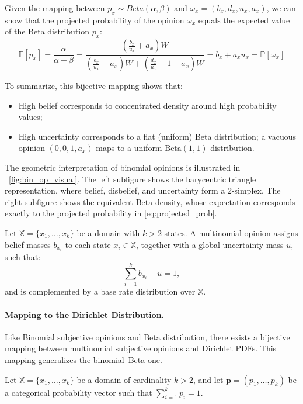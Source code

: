 Given the mapping between \(p_x \sim Beta(\alpha,\beta)\) and \(\omega_x=\left(b_x, d_x, u_x, a_x \right)\), we can show that the projected probability of the opinion \(\omega_x\) equals the expected value of the Beta distribution \(p_x\):
\begin{equation}
    \mathbb{E}[p_x] = \frac{\alpha}{\alpha + \beta} = \frac{\left(\frac{b_x}{u_x} + a_x\right)W }{\left(\frac{b_x}{u_x} + a_x\right)W  + \left(\frac{d_x}{u_x} + 1 - a_x \right)W} = b_x + a_x u_x = \mathbb{P}[\omega_x]
\end{equation}


To summarize, this bijective mapping shows that:
\begin{itemize}
    \item High belief corresponds to concentrated density around high probability values;
    \item High uncertainty corresponds to a flat (uniform) Beta distribution; a vacuous opinion $(0,0,1,a_x)$ maps to a uniform $\mathrm{Beta}(1,1)$ distribution.
\end{itemize}

The geometric interpretation of binomial opinions is illustrated in ~\cref{fig:bin_op_visual}. The left subfigure shows the barycentric triangle representation, where belief, disbelief, and uncertainty form a 2-simplex. The right subfigure shows the equivalent Beta density, whose expectation corresponds exactly to the projected probability in \cref{eq:projected_prob}.


\begin{definition}
Let \(\mathbb{X} = \{x_1, \dots, x_k\}\) be a domain with \(k > 2\) states. A multinomial opinion assigns belief masses \(b_{x_i}\) to each state \(x_i \in \mathbb{X}\), together with a global uncertainty mass \(u\), such that:
\[
\sum_{i=1}^{k} b_{x_i} + u = 1,
\]
and is complemented by a base rate distribution over \(\mathbb{X}\).
\end{definition}

\paragraph{Mapping to the Dirichlet Distribution.}

Like Binomial subjective opinions and Beta distribution, there exists a bijective mapping between multinomial subjective opinions and Dirichlet \acp{PDF}. This mapping generalizes the binomial–Beta one.

Let $\mathbb{X} = \{x_1, \dots, x_k\}$ be a domain of cardinality $k > 2$, and let $\boldsymbol{p} = (p_1, \dots, p_k)$ be a categorical probability vector such that $\sum_{i=1}^{k} p_i = 1$.

